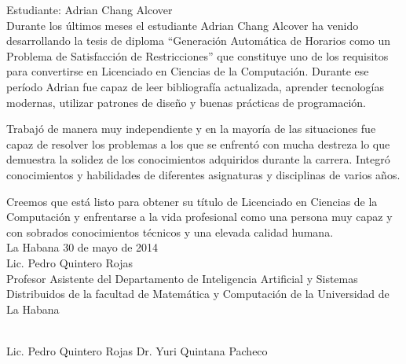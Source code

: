 \begin{opinion}

\noindent Estudiante: Adrian Chang Alcover\\

Durante los últimos meses el estudiante Adrian Chang Alcover ha venido desarrollando la tesis de diploma ``Generación Automática de Horarios como un Problema de Satisfacción de Restricciones'' que constituye uno de los requisitos para convertirse en Licenciado en Ciencias de la Computación. Durante ese período Adrian fue capaz de leer bibliografía actualizada, aprender tecnologías modernas, utilizar patrones de diseño y buenas prácticas de programación.

Trabajó de manera muy independiente y en la mayoría de las situaciones fue capaz de resolver los problemas a los que se enfrentó con mucha destreza lo que demuestra la solidez de los conocimientos adquiridos durante la carrera. Integró conocimientos y habilidades de diferentes asignaturas y disciplinas de varios años.

Creemos que está listo para obtener su título de Licenciado en Ciencias de la Computación y enfrentarse a la vida profesional como una persona muy capaz y con sobrados conocimientos técnicos y una elevada calidad humana.\\

\noindent La Habana 30 de mayo de 2014\\
Lic. Pedro Quintero Rojas\\
Profesor Asistente del Departamento de Inteligencia Artificial y Sistemas Distribuidos de la facultad de Matemática y Computación de la Universidad de La Habana

\vfill
\begin{flushleft}
\underline{\hspace{140pt}}\hfill \underline{\hspace{140pt}}\\
Lic. Pedro Quintero Rojas \hfill Dr. Yuri Quintana Pacheco \hspace*{7pt}
\end{flushleft}
\end{opinion}